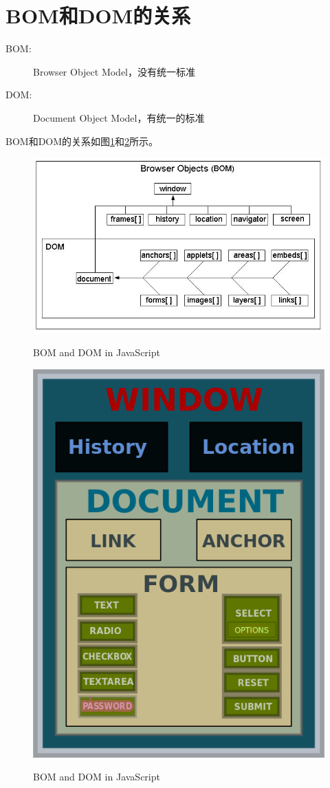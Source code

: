 \section[BOM和DOM的关系]{BOM和DOM的关系}
\begin{description}
  \item[BOM: ] Browser Object Model，没有统一标准
  \item[DOM: ] Document Object Model，有统一的标准
\end{description}

BOM和DOM的关系如图\ref{fig:bom_and_dom}和\ref{fig:bom_and_dom_2}所示。
\begin{figure}
  \centering
  \includegraphics[width=.8\textwidth]{picturedir/js_bom_dom.jpg}\\
  \caption{BOM and DOM in JavaScript}\label{fig:bom_and_dom}
\end{figure}

\begin{figure}
  \centering
  \includegraphics[width=.5\textwidth]{picturedir/js_bom_dom_2.png}\\
  \caption{BOM and DOM in JavaScript}\label{fig:bom_and_dom_2}
\end{figure}


